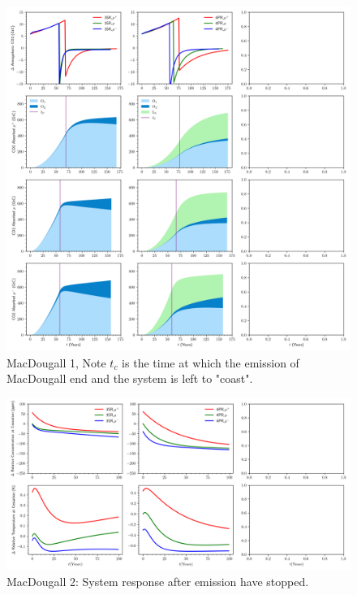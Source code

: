 \documentclass[11pt, a4paper, pdftex, twoside, dvipsnames]{article}
\begin{document}
\begin{figure}
    \centering
    \includegraphics[width=\textwidth]{fig/simulate_macdougall_1.png}
    \caption{MacDougall 1, Note $t_c$ is the time at which the emission of MacDougall end and the system is left to "coast". }
\end{figure}


\begin{figure}
    \centering
    \includegraphics[width=\textwidth]{fig/simulate_macdougall_2.png}
    \caption{MacDougall 2: System response after emission have stopped.}
\end{figure}



\appendix


\clearpage

\end{document}
